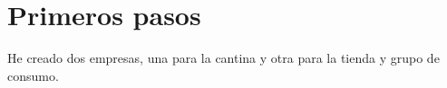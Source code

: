 \chapter{Primeros pasos}

He creado dos empresas, una para la cantina y otra para la tienda y grupo de consumo.


